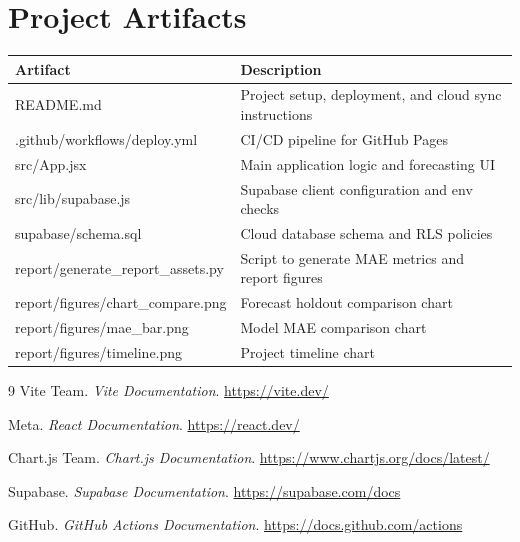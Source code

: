 \documentclass[12pt,a4paper]{report}
\begin{document}
\chapter{Project Artifacts}
\begin{longtable}{p{} p{}}
\toprule
Artifact & Description \\
\midrule
README.md & Project setup, deployment, and cloud sync instructions \\
.github/workflows/deploy.yml & CI/CD pipeline for GitHub Pages \\
src/App.jsx & Main application logic and forecasting UI \\
src/lib/supabase.js & Supabase client configuration and env checks \\
supabase/schema.sql & Cloud database schema and RLS policies \\
report/generate\_report\_assets.py & Script to generate MAE metrics and report figures \\
report/figures/chart\_compare.png & Forecast holdout comparison chart \\
report/figures/mae\_bar.png & Model MAE comparison chart \\
report/figures/timeline.png & Project timeline chart \\
\bottomrule
\end{longtable}

\begin{thebibliography}{9}
Vite Team.
\textit{Vite Documentation}.
\url{https://vite.dev/}

Meta.
\textit{React Documentation}.
\url{https://react.dev/}

Chart.js Team.
\textit{Chart.js Documentation}.
\url{https://www.chartjs.org/docs/latest/}

Supabase.
\textit{Supabase Documentation}.
\url{https://supabase.com/docs}

GitHub.
\textit{GitHub Actions Documentation}.
\url{https://docs.github.com/actions}
\end{thebibliography}
\end{document}
